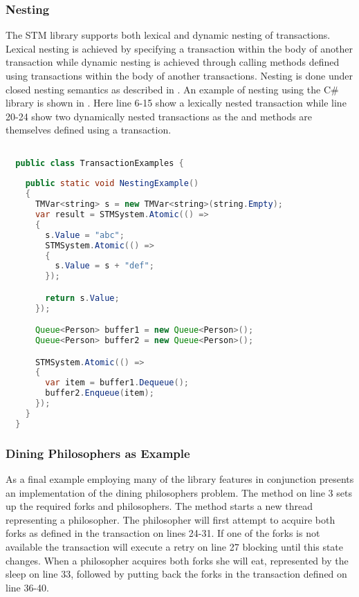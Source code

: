 \subsubsection{Nesting}
The \ac{STM} library supports both lexical and dynamic nesting of transactions. Lexical nesting is achieved by specifying a transaction within the body of another transaction while dynamic nesting is achieved through calling methods defined using transactions within the body of another transactions. Nesting is done under closed nesting semantics as described in . An example of nesting using the C\# library is shown in . Here line 6-15 show a lexically nested transaction while line 20-24 show two dynamically nested transactions as the  and  methods are themselves defined using a transaction. 
\begin{lstlisting}[label=lst:library_nesting,
  caption={Library Nesting},
  language=Java,  
  showspaces=false,
  showtabs=false,
  breaklines=true,
  showstringspaces=false,
  breakatwhitespace=true,
  commentstyle=\color{greencomments},
  keywordstyle=\color{bluekeywords},
  stringstyle=\color{redstrings},
  morekeywords={atomic, retry, orElse, var, get, set}]  % Start your code-block

  public class TransactionExamples {
    
    public static void NestingExample()
    {
      TMVar<string> s = new TMVar<string>(string.Empty);
      var result = STMSystem.Atomic(() =>
      {
        s.Value = "abc";
        STMSystem.Atomic(() =>
        {
          s.Value = s + "def";
        });

        return s.Value;
      });

      Queue<Person> buffer1 = new Queue<Person>();
      Queue<Person> buffer2 = new Queue<Person>();

      STMSystem.Atomic(() =>
      {
        var item = buffer1.Dequeue();
        buffer2.Enqueue(item);
      });
    }
  }
\end{lstlisting}
\subsubsection{Dining Philosophers as Example}
As a final example employing many of the library features in conjunction  presents an implementation of the dining philosophers problem\cite[p. 673]{hoare1978communicating}.  The  method on line 3 sets up the required forks and philosophers. The  method starts a new thread representing a philosopher. The philosopher will first attempt to acquire both forks as defined in the transaction on lines 24-31. If one of the forks is not available the transaction will execute a retry on line 27 blocking until this state changes. When a philosopher acquires both forks she will eat, represented by the sleep on line 33, followed by putting back the forks in the transaction defined on line 36-40.

